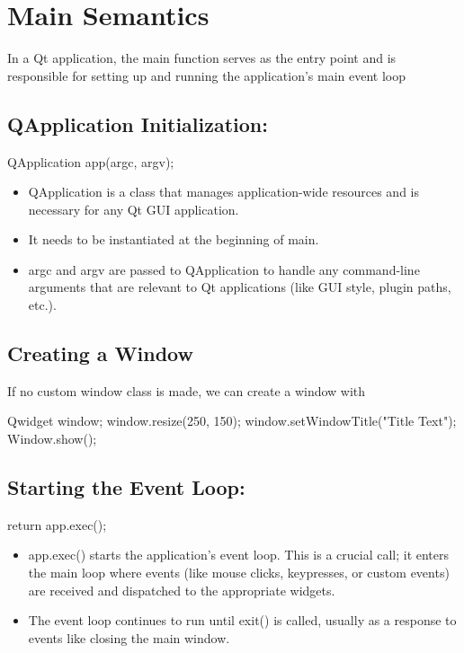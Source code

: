 \documentclass{report}
\begin{document}
    \pagebreak 
    \section*{Main Semantics}
    \bigbreak \noindent 
    In a Qt application, the main function serves as the entry point and is responsible for setting up and running the application's main event loop
    \bigbreak \noindent 
    \subsection*{QApplication Initialization:}
    \bigbreak \noindent 
    \begin{cppcode}
    QApplication app(argc, argv);
    \end{cppcode}
    \begin{itemize}
        \item QApplication is a class that manages application-wide resources and is necessary for any Qt GUI application.
        \item It needs to be instantiated at the beginning of main.
        \item argc and argv are passed to QApplication to handle any command-line arguments that are relevant to Qt applications (like GUI style, plugin paths, etc.).
    \end{itemize}

    \bigbreak \noindent 
    \subsection*{Creating a Window}
    \bigbreak \noindent 
    If no custom window class is made, we can create a window with
    \bigbreak \noindent 
    \begin{cppcode}
Qwidget window;
window.resize(250, 150);
window.setWindowTitle("Title Text");
Window.show();
    \end{cppcode}

    \bigbreak \noindent 
    \subsection*{Starting the Event Loop:}
    \bigbreak \noindent 
    \begin{cppcode}
    return app.exec();
    \end{cppcode}
    \begin{itemize}
        \item app.exec() starts the application's event loop. This is a crucial call; it enters the main loop where events (like mouse clicks, keypresses, or custom events) are received and dispatched to the appropriate widgets.
        \item The event loop continues to run until exit() is called, usually as a response to events like closing the main window.
    \end{itemize}
\end{document}
